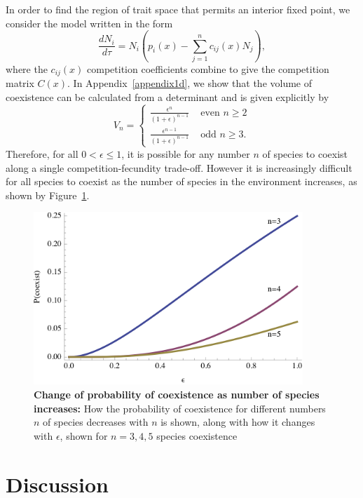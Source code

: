 In order to find the region of trait space that permits an interior fixed point, we consider the model written in the form
\begin{equation}
\frac{dN_i}{d\tau}=N_i\left(p_i(x) - \sum_{j=1}^n c_{ij}(x)N_j\right),
\end{equation}
where the $c_{ij}(x)$ competition coefficients combine to give the competition matrix $C(x)$. In Appendix~\ref{appendix1d}, we show that the volume of coexistence can be calculated from a determinant and is given explicitly by
\[
V_{n}=
\left\{
\begin{array}{rl}
\frac{\epsilon^{n}}{(1+\epsilon)^{n-1}} & \mbox{ even }n\geq 2\\
\frac{\epsilon^{n-1}}{(1+\epsilon)^{n-1}} & \mbox{ odd }n\geq 3. 
\end{array} \right.
\]
Therefore, for all $0<\epsilon \leq1$, it is possible for any number $n$ of species to coexist along a single competition-fecundity trade-off. However it is increasingly difficult for all species to coexist as the number of species in the environment increases, as shown by Figure~\ref{fig:ndif}.

\begin{figure}[htbp]
   \centering
   \includegraphics[width=4in]{Figure3}
   \caption[Change of probability of coexistence as number of species increases]{\textbf{Change of probability of coexistence as number of species increases:} How the probability of coexistence for different numbers $n$ of species decreases with $n$ is shown, along with how it changes with $\epsilon$, shown for $n=3,4,5$ species coexistence}
   \label{fig:ndif}
\end{figure}


\section{Discussion}

